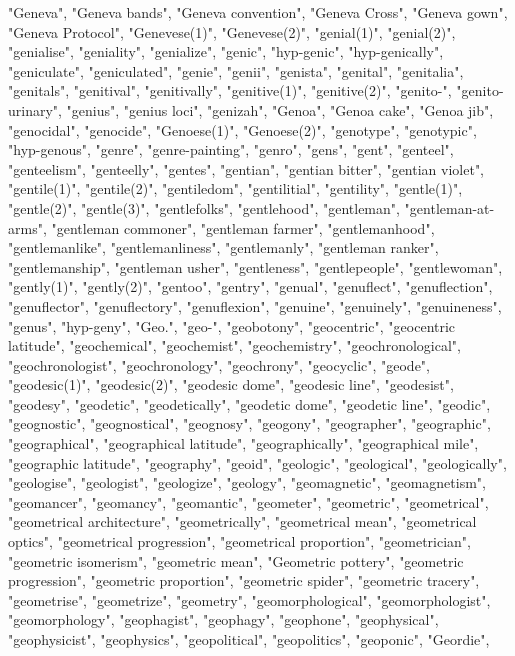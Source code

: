 "Geneva",
"Geneva bands",
"Geneva convention",
"Geneva Cross",
"Geneva gown",
"Geneva Protocol",
"Genevese(1)",
"Genevese(2)",
"genial(1)",
"genial(2)",
"genialise",
"geniality",
"genialize",
"genic",
"hyp-genic",
"hyp-genically",
"geniculate",
"geniculated",
"genie",
"genii",
"genista",
"genital",
"genitalia",
"genitals",
"genitival",
"genitivally",
"genitive(1)",
"genitive(2)",
"genito-",
"genito-urinary",
"genius",
"genius loci",
"genizah",
"Genoa",
"Genoa cake",
"Genoa jib",
"genocidal",
"genocide",
"Genoese(1)",
"Genoese(2)",
"genotype",
"genotypic",
"hyp-genous",
"genre",
"genre-painting",
"genro",
"gens",
"gent",
"genteel",
"genteelism",
"genteelly",
"gentes",
"gentian",
"gentian bitter",
"gentian violet",
"gentile(1)",
"gentile(2)",
"gentiledom",
"gentilitial",
"gentility",
"gentle(1)",
"gentle(2)",
"gentle(3)",
"gentlefolks",
"gentlehood",
"gentleman",
"gentleman-at-arms",
"gentleman commoner",
"gentleman farmer",
"gentlemanhood",
"gentlemanlike",
"gentlemanliness",
"gentlemanly",
"gentleman ranker",
"gentlemanship",
"gentleman usher",
"gentleness",
"gentlepeople",
"gentlewoman",
"gently(1)",
"gently(2)",
"gentoo",
"gentry",
"genual",
"genuflect",
"genuflection",
"genuflector",
"genuflectory",
"genuflexion",
"genuine",
"genuinely",
"genuineness",
"genus",
"hyp-geny",
"Geo.",
"geo-",
"geobotony",
"geocentric",
"geocentric latitude",
"geochemical",
"geochemist",
"geochemistry",
"geochronological",
"geochronologist",
"geochronology",
"geochrony",
"geocyclic",
"geode",
"geodesic(1)",
"geodesic(2)",
"geodesic dome",
"geodesic line",
"geodesist",
"geodesy",
"geodetic",
"geodetically",
"geodetic dome",
"geodetic line",
"geodic",
"geognostic",
"geognostical",
"geognosy",
"geogony",
"geographer",
"geographic",
"geographical",
"geographical latitude",
"geographically",
"geographical mile",
"geographic latitude",
"geography",
"geoid",
"geologic",
"geological",
"geologically",
"geologise",
"geologist",
"geologize",
"geology",
"geomagnetic",
"geomagnetism",
"geomancer",
"geomancy",
"geomantic",
"geometer",
"geometric",
"geometrical",
"geometrical architecture",
"geometrically",
"geometrical mean",
"geometrical optics",
"geometrical progression",
"geometrical proportion",
"geometrician",
"geometric isomerism",
"geometric mean",
"Geometric pottery",
"geometric progression",
"geometric proportion",
"geometric spider",
"geometric tracery",
"geometrise",
"geometrize",
"geometry",
"geomorphological",
"geomorphologist",
"geomorphology",
"geophagist",
"geophagy",
"geophone",
"geophysical",
"geophysicist",
"geophysics",
"geopolitical",
"geopolitics",
"geoponic",
"Geordie",
